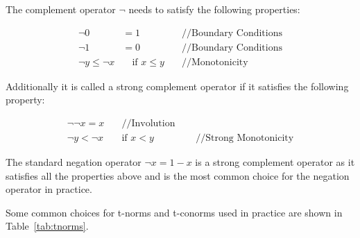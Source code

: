 The complement operator $\neg$ needs to satisfy the following properties:

\begin{align*}
      \neg 0             & = 1                       & \quad \text{//Boundary Conditions} \\
      \neg 1             & = 0                       & \quad \text{//Boundary Conditions} \\
      \neg y \leq \neg x & \quad \text{if } x \leq y & \quad \text{//Monotonicity}
\end{align*}

Additionally it is called a strong complement operator if it satisfies the following property:

\begin{align}
      \neg \neg x = x & \quad \text{//Involution}                                       \\
      \neg y < \neg x & \quad \text{if } x < y    & \quad \text{ //Strong Monotonicity}
\end{align}


The standard negation operator $\neg x = 1 - x$ is a strong complement operator as it satisfies all the properties above and is the most common choice for the negation operator in practice.

Some common choices for t-norms and t-conorms used in practice are shown in Table~\ref{tab:tnorms}.

